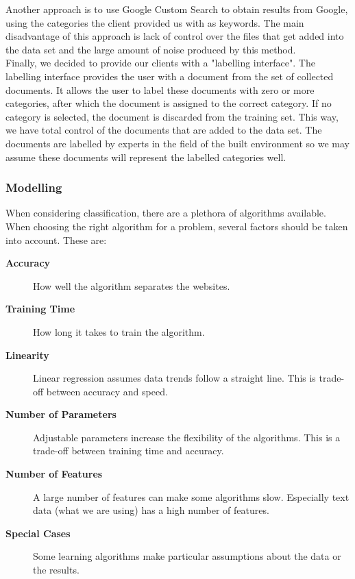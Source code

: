 Another approach is to use Google Custom Search to obtain results from Google, using the categories the client provided us with as keywords. The main disadvantage of this approach is lack of control over the files that get added into the data set and  the large amount of noise produced by this method.\\

Finally, we decided to provide our clients with a "labelling interface". The labelling interface provides the user with a document from the set of collected documents. It allows the user to label these documents with zero or more categories, after which the document is assigned to the correct category. If no category is selected, the document is discarded from the training set. This way, we have total control of the documents that are added to the data set. The documents are labelled by experts in the field of the built environment so we may assume these documents will represent the labelled categories well. 

\subsubsection{Modelling}
When considering classification, there are a plethora of algorithms available. When choosing the right algorithm for a problem, several factors should be taken into account\cite{MLCheatSheet}. These are:
    \begin{description}
        \item[\textbf{Accuracy}] How well the algorithm separates the websites.
        \item[\textbf{Training Time}] How long it takes to train the algorithm.
        \item[\textbf{Linearity}] Linear regression assumes data trends follow a straight line. This is trade-off between accuracy and speed.
        \item[\textbf{Number of Parameters}] Adjustable parameters increase the flexibility of the algorithms. This is a trade-off between training time and accuracy.
        \item[\textbf{Number of Features}] A large number of features can make some algorithms slow. Especially text data (what we are using) has a high number of features.
        \item[\textbf{Special Cases}] Some learning algorithms make particular assumptions about the data or the results.
    \end{description}

